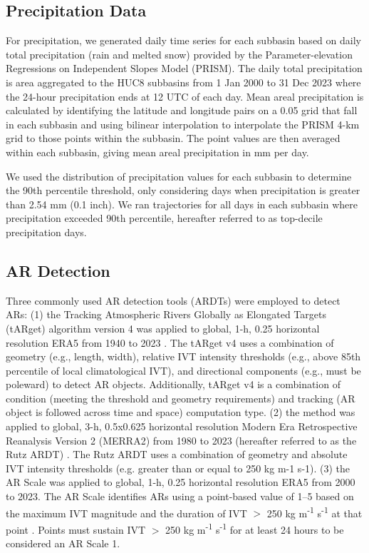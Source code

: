 \documentclass[draft]{agujournal2019}
\begin{document}
\subsection{Precipitation Data}

For precipitation, we generated daily time series for each subbasin based on daily total precipitation (rain and melted snow) provided by the Parameter-elevation Regressions on Independent Slopes Model (PRISM). The daily total precipitation is area aggregated to the HUC8 subbasins from 1 Jan 2000 to 31 Dec 2023 where the 24-hour precipitation ends at 12 UTC of each day. Mean areal precipitation is calculated by identifying the latitude and longitude pairs on a 0.05\textdegree{} grid that fall in each subbasin and using bilinear interpolation to interpolate the PRISM 4-km grid to those points within the subbasin. The point values are then averaged within each subbasin, giving mean areal precipitation in mm per day. 


We used the distribution of precipitation values for each subbasin to determine the 90th percentile threshold, only considering days when precipitation is greater than 2.54 mm (0.1 inch). We ran trajectories for all days in each subbasin where precipitation exceeded 90th percentile, hereafter referred to as top-decile precipitation days.


\subsection{AR Detection}

Three commonly used AR detection tools (ARDTs) were employed to detect ARs: (1) the Tracking Atmospheric Rivers Globally as Elongated Targets (tARget) algorithm version 4 was applied to global, 1-h, 0.25\textdegree{} horizontal resolution ERA5 from 1940 to 2023 \cite{Guan2024AERA5}. The tARget v4 uses a combination of geometry (e.g., length, width), relative IVT intensity thresholds (e.g., above 85th percentile of local climatological IVT), and directional components (e.g., must be poleward) to detect AR objects. Additionally, tARget v4 is a combination of condition (meeting the threshold and geometry requirements) and tracking (AR object is followed across time and space) computation type. (2) the  method was applied to global, 3-h, 0.5\textdegree{}x0.625\textdegree{} horizontal resolution Modern Era Retrospective Reanalysis Version 2 (MERRA2) from 1980 to 2023 (hereafter referred to as the Rutz ARDT) \cite{Bosilovich2015, Gelaro2017}. The Rutz ARDT uses a combination of geometry and absolute IVT intensity thresholds (e.g. greater than or equal to 250 kg m-1 s-1). (3) the AR Scale \cite{MartinRalph2019} was applied to global, 1-h, 0.25\textdegree{} horizontal resolution ERA5 from 2000 to 2023. The AR Scale identifies ARs using a point-based value of 1--5 based on the maximum IVT magnitude and the duration of IVT $>$ 250 kg m\textsuperscript{-1} s\textsuperscript{-1} at that point \cite{MartinRalph2019}. Points must sustain IVT $>$ 250 kg m\textsuperscript{-1} s\textsuperscript{-1} for at least 24 hours to be considered an AR Scale 1. 
\end{document}
